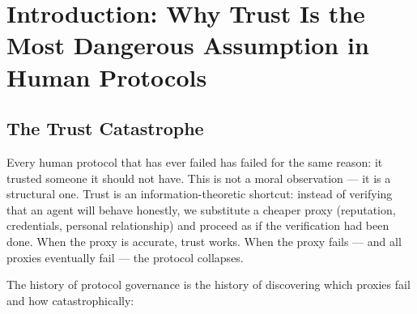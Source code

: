 \documentclass[12pt,a4paper]{article}
\theoremstyle{remark}
\begin{document}
\begin{abstract}
\medskip
\noindent\textbf{Keywords:} protocol governance, maintainer rotation, game theory,
Hoeffding inequality, Nash equilibrium, mutual audit, trustless architecture,
bias detection, finite rotation cycles, mechanism design

\medskip
\noindent\textbf{}
SCXSCX
——(1) 
$g$$M>1$(2) 
(3) Hoeffding$e^{-2M\Delta^2}$
(4) $\sum g = 0$


\textit{}
SCX——$g(t)$
Hoeffding

\medskip
\noindent\textbf{} Hoeffding

\end{abstract}

\newpage
\tableofcontents
\newpage

\section{}
\section{Introduction: Why Trust Is the Most Dangerous Assumption in Human Protocols}

\subsection{The Trust Catastrophe}

Every human protocol that has ever failed has failed for the same reason:
it trusted someone it should not have. This is not a moral observation —
it is a structural one. Trust is an information-theoretic shortcut: instead
of verifying that an agent will behave honestly, we substitute a cheaper proxy
(reputation, credentials, personal relationship) and proceed as if the
verification had been done. When the proxy is accurate, trust works. When the
proxy fails — and all proxies eventually fail — the protocol collapses.

The history of protocol governance is the history of discovering which proxies
fail and how catastrophically:
\end{document}
